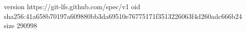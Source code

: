 version https://git-lfs.github.com/spec/v1
oid sha256:41a658b70197a609880bb3da69510e76775171f3513226063f4d260adc666b24
size 290998
